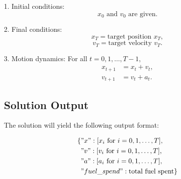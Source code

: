 \documentclass{article}
\begin{document}
1. Initial conditions:
   \[
   x_0 \text{ and } v_0 \text{ are given.}
   \]
   
2. Final conditions:
   \[
   x_T = \text{target position } x_T,
   \]
   \[
   v_T = \text{target velocity } v_T.
   \]

3. Motion dynamics:
   For all $t = 0, 1, \ldots, T-1$,
   \begin{align*}
   x_{t+1} &= x_t + v_t, \\
   v_{t+1} &= v_t + a_t.
   \end{align*}

\subsection*{Solution Output}
The solution will yield the following output format:

\begin{align*}
\{
    & "x": [x_i \text{ for } i = 0, 1, \ldots, T], \\
    & "v": [v_i \text{ for } i = 0, 1, \ldots, T], \\
    & "a": [a_i \text{ for } i = 0, 1, \ldots, T], \\
    & "fuel\_spend": \text{total fuel spent}
\}
\end{align*}
\end{document}

